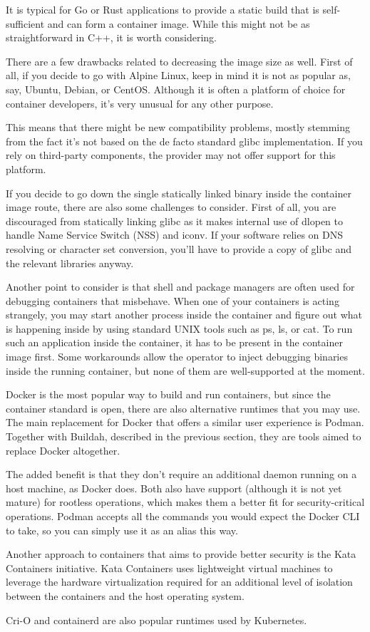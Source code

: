 It is typical for Go or Rust applications to provide a static build that is self-sufficient and can form a container image. While this might not be as straightforward in C++, it is worth considering.

There are a few drawbacks related to decreasing the image size as well. First of all, if you decide to go with Alpine Linux, keep in mind it is not as popular as, say, Ubuntu, Debian, or CentOS. Although it is often a platform of choice for container developers, it's very unusual for any other purpose.

This means that there might be new compatibility problems, mostly stemming from the fact it's not based on the de facto standard glibc implementation. If you rely on third-party components, the provider may not offer support for this platform.

If you decide to go down the single statically linked binary inside the container image route, there are also some challenges to consider. First of all, you are discouraged from statically linking glibc as it makes internal use of dlopen to handle Name Service Switch (NSS) and iconv. If your software relies on DNS resolving or character set conversion, you'll have to provide a copy of glibc and the relevant libraries anyway.

Another point to consider is that shell and package managers are often used for debugging containers that misbehave. When one of your containers is acting strangely, you may start another process inside the container and figure out what is happening inside by using standard UNIX tools such as ps, ls, or cat. To run such an application inside the container, it has to be present in the container image first. Some workarounds allow the operator to inject debugging binaries inside the running container, but none of them are well-supported at the moment.


Docker is the most popular way to build and run containers, but since the container standard is open, there are also alternative runtimes that you may use. The main replacement for Docker that offers a similar user experience is Podman. Together with Buildah, described in the previous section, they are tools aimed to replace Docker altogether.

The added benefit is that they don't require an additional daemon running on a host machine, as Docker does. Both also have support (although it is not yet mature) for rootless operations, which makes them a better fit for security-critical operations. Podman accepts all the commands you would expect the Docker CLI to take, so you can simply use it as an alias this way.

Another approach to containers that aims to provide better security is the Kata Containers initiative. Kata Containers uses lightweight virtual machines to leverage the hardware virtualization required for an additional level of isolation between the containers and the host operating system.

Cri-O and containerd are also popular runtimes used by Kubernetes.


